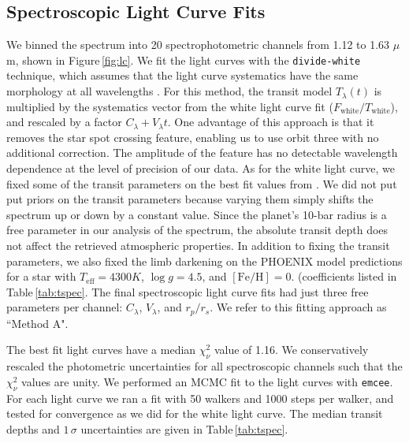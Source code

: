 \documentclass[twocolumn, trackchanges]{aastex61}
\begin{document}
\subsection{Spectroscopic Light Curve Fits}
We binned the spectrum into 20 spectrophotometric channels from 1.12 to 1.63 $\mu$m, shown in Figure\,\ref{fig:lc}. We fit the light curves with the \texttt{divide-white} technique, which assumes that the light curve systematics have the same morphology at all wavelengths \citep{stevenson14c, kreidberg14a}. For this method, the transit model $T_\lambda(t)$ is multiplied by the systematics vector from the white light curve fit ($F_\mathrm{white}/T_\mathrm{white}$), and rescaled by a factor $C_\lambda + V_\lambda t$.  One advantage of this approach is that it removes the star spot crossing feature, enabling us to use orbit three with no additional correction. The amplitude of the feature has no detectable wavelength dependence at the level of precision of our data.  As for the white light curve, we fixed some of the transit parameters on the best fit values from \cite{dai17}. We did not put put priors on the transit parameters because varying them simply shifts the spectrum up or down by a constant value. Since the planet's 10-bar radius is a free parameter in our analysis of the spectrum, the absolute transit depth does not affect the retrieved atmospheric properties. In addition to fixing the transit parameters, we also fixed the limb darkening on the PHOENIX model predictions for a star with $T_\mathrm{eff} = 4300 K$, $\log g = 4.5$, and $[\mathrm{Fe/H}] = 0.$ (coefficients listed in Table\,\ref{tab:tspec}.  The final spectroscopic light curve fits had just three free parameters per channel: $C_\lambda$, $V_\lambda$, and $r_p/r_s$.  We refer to this fitting approach as ``Method A".

The best fit light curves have a median $\chi^2_\nu$ value of 1.16.  We conservatively rescaled the photometric uncertainties for all spectroscopic channels such that the $\chi^2_\nu$ values are unity. We performed an MCMC fit to the light curves with \texttt{emcee}.  For each light curve we ran a fit with 50 walkers and 1000 steps per walker, and tested for convergence as we did for the white light curve. The median transit depths and $1\,\sigma$ uncertainties are given in Table\,\ref{tab:tspec}. 
\end{document}

